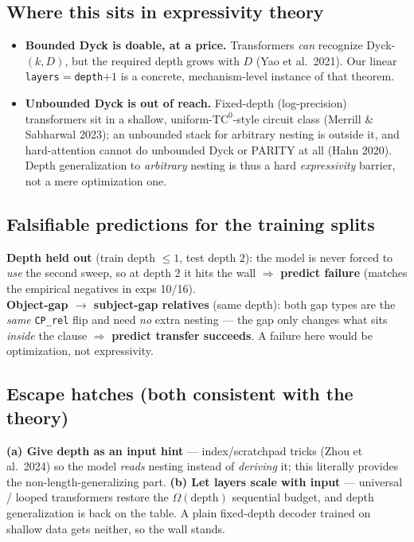 \documentclass[11pt]{article}
\newcommand{\code}[1]{\texttt{#1}}
\begin{document}
\subsection{Where this sits in expressivity theory}
\begin{itemize}\setlength{\itemsep}{1pt}
\item \textbf{Bounded Dyck is doable, at a price.} Transformers \emph{can} recognize Dyck-$(k,D)$,
  but the required depth grows with $D$ (Yao et al.\ 2021). Our linear \code{layers}$=$\code{depth}$+1$
  is a concrete, mechanism-level instance of that theorem.
\item \textbf{Unbounded Dyck is out of reach.} Fixed-depth (log-precision) transformers sit in a
  shallow, uniform-$\mathrm{TC}^0$-style circuit class (Merrill \& Sabharwal 2023); an unbounded
  stack for arbitrary nesting is outside it, and hard-attention cannot do unbounded Dyck or PARITY
  at all (Hahn 2020). Depth generalization to \emph{arbitrary} nesting is thus a hard
  \emph{expressivity} barrier, not a mere optimization one.
\end{itemize}

\subsection{Falsifiable predictions for the training splits}
\begin{keybox}
\textbf{Depth held out} (train depth $\le 1$, test depth $2$): the model is never forced to
\emph{use} the second sweep, so at depth 2 it hits the wall $\Rightarrow$ \textbf{predict failure}
(matches the empirical negatives in exps 10/16).\\[3pt]
\textbf{Object-gap $\to$ subject-gap relatives} (same depth): both gap types are the \emph{same}
\code{CP\_rel} flip and need \emph{no} extra nesting --- the gap only changes what sits \emph{inside}
the clause $\Rightarrow$ \textbf{predict transfer succeeds}. A failure here would be optimization,
not expressivity.
\end{keybox}

\subsection{Escape hatches (both consistent with the theory)}
\textbf{(a) Give depth as an input hint} --- index/scratchpad tricks (Zhou et al.\ 2024) so the model
\emph{reads} nesting instead of \emph{deriving} it; this literally provides the non-length-generalizing
part. \textbf{(b) Let layers scale with input} --- universal / looped transformers restore the
$\Omega(\text{depth})$ sequential budget, and depth generalization is back on the table. A plain
fixed-depth decoder trained on shallow data gets neither, so the wall stands.
\end{document}
